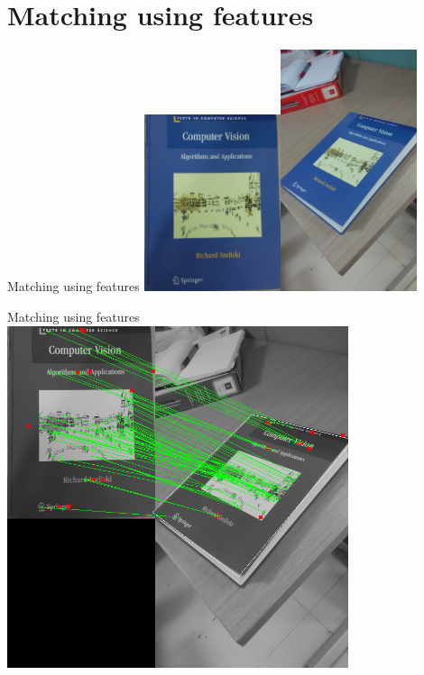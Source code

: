 \documentclass{beamer}
\begin{document}
\section{Matching using features}
\begin{frame}{Matching using features}
    \centering
        \includegraphics[width=40mm]{images/t2.jpg}\includegraphics[width=40mm]{images/p2.jpg}

\end{frame}

\begin{frame}{Matching using features}
    \centering
        \includegraphics[width=100mm]{images/siftmatch1.png}

\end{frame}
\end{document}
